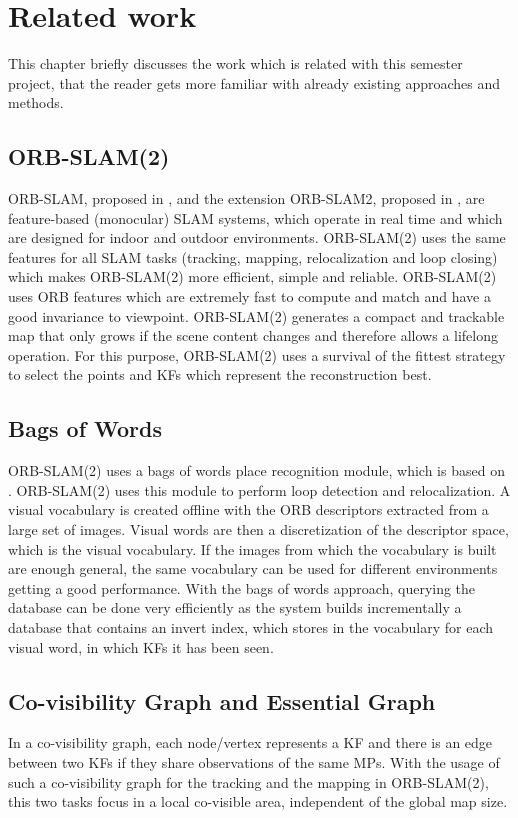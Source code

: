 \chapter{Related work}
\label{sec:related_work}

This chapter briefly discusses the work which is related with this semester project, that the reader gets more familiar with already existing approaches and methods.

\section{ORB-SLAM(2)}
ORB-SLAM, proposed in \cite{Mur-Artal2015}, and the extension ORB-SLAM2, proposed in \cite{Mur-Artal2016}, are feature-based (monocular) \ac{SLAM} systems, which operate in real time and which are designed for indoor and outdoor environments. ORB-SLAM(2) uses the same features for all \ac{SLAM} tasks (tracking, mapping, relocalization and loop closing) which makes ORB-SLAM(2) more efficient, simple and reliable. ORB-SLAM(2) uses ORB features which are extremely fast to compute and match and have a good invariance to viewpoint. ORB-SLAM(2) generates a compact and trackable map that only grows if the scene content changes and therefore allows a lifelong operation. For this purpose, ORB-SLAM(2) uses a survival of the fittest strategy to select the points and \acfp{KF} which represent the reconstruction best.

\section{Bags of Words}
ORB-SLAM(2) uses a bags of words place recognition module, which is based on \cite{Galvez-Lopez2012}. ORB-SLAM(2) uses this module to perform loop detection and relocalization. A visual vocabulary is created offline with the ORB descriptors extracted from a large set of images. Visual words are then a discretization of the descriptor space, which is the visual vocabulary. If the images from which the vocabulary is built are enough general, the same vocabulary can be used for different environments getting a good performance. With the bags of words approach, querying the database can be done very efficiently as the system builds incrementally a database that contains an invert index, which stores in the vocabulary for each visual word, in which \acp{KF} it has been seen.

\section{Co-visibility Graph and Essential Graph}
In a co-visibility graph, each node/vertex represents a \ac{KF} and there is an edge between two \acp{KF} if they share observations of the same \acfp{MP}. With the usage of such a co-visibility graph for the tracking and the mapping in ORB-SLAM(2), this two tasks focus in a local co-visible area, independent of the global map size.

